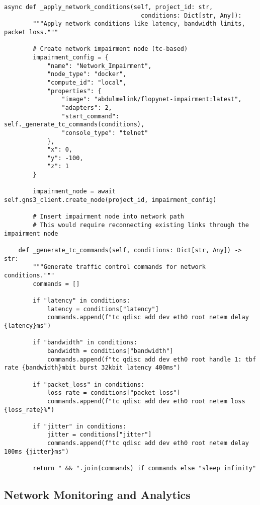\begin{lstlisting}[style=pythoncode, caption=GNS3 Template Utilities]
    async def _apply_network_conditions(self, project_id: str, 
                                      conditions: Dict[str, Any]):
        """Apply network conditions like latency, bandwidth limits, packet loss."""
        
        # Create network impairment node (tc-based)
        impairment_config = {
            "name": "Network_Impairment",
            "node_type": "docker",
            "compute_id": "local",
            "properties": {
                "image": "abdulmelink/flopynet-impairment:latest",
                "adapters": 2,
                "start_command": self._generate_tc_commands(conditions),
                "console_type": "telnet"
            },
            "x": 0,
            "y": -100,
            "z": 1
        }
        
        impairment_node = await self.gns3_client.create_node(project_id, impairment_config)
        
        # Insert impairment node into network path
        # This would require reconnecting existing links through the impairment node
    
    def _generate_tc_commands(self, conditions: Dict[str, Any]) -> str:
        """Generate traffic control commands for network conditions."""
        commands = []
        
        if "latency" in conditions:
            latency = conditions["latency"]
            commands.append(f"tc qdisc add dev eth0 root netem delay {latency}ms")
        
        if "bandwidth" in conditions:
            bandwidth = conditions["bandwidth"]
            commands.append(f"tc qdisc add dev eth0 root handle 1: tbf rate {bandwidth}mbit burst 32kbit latency 400ms")
        
        if "packet_loss" in conditions:
            loss_rate = conditions["packet_loss"]
            commands.append(f"tc qdisc add dev eth0 root netem loss {loss_rate}%")
        
        if "jitter" in conditions:
            jitter = conditions["jitter"]
            commands.append(f"tc qdisc add dev eth0 root netem delay 100ms {jitter}ms")
        
        return " && ".join(commands) if commands else "sleep infinity"
\end{lstlisting}

\subsection{Network Monitoring and Analytics}

